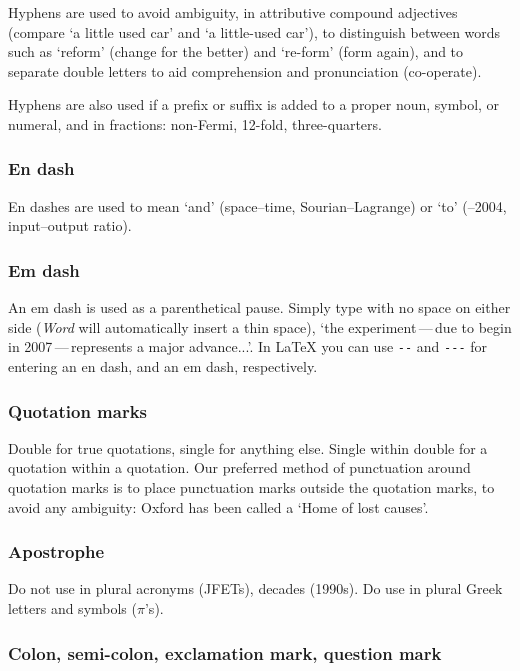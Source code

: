 \documentclass{cernyrep}
\begin{document}
Hyphens are used to avoid ambiguity, \ie in attributive compound
adjectives (compare `a little used car' and `a little-used car'), to
distinguish between words such as `reform' (change for the better) and
`re-form' (form again), and to separate double letters to aid
comprehension and pronunciation (\eg co-operate).

Hyphens are also used if a prefix or suffix is added to a proper noun,
symbol, or numeral, and in fractions: \eg non-Fermi, 12-fold,
three-quarters.

\subsubsection{En dash}

En dashes are used to mean `and' (\eg space--time, Sourian--Lagrange)
or `to' (--2004, input--output ratio).

\subsubsection{Em dash}

An em dash is used as a parenthetical pause. Simply type with no space
on either side (\emph{Word} will automatically insert a thin space),
\eg `the experiment\,---\,due to begin in 2007\,---\,represents a
major advance...'. In \LaTeX{} you can use \texttt{{-}{-}} and
\texttt{{-}{-}{-}} for entering an en dash, and an em dash,
respectively.

\subsubsection{Quotation marks}

Double for true quotations, single for anything else. Single within
double for a quotation within a quotation. Our preferred method of
punctuation around quotation marks is to place punctuation marks
outside the quotation marks, to avoid any ambiguity: Oxford has been
called a `Home of lost causes'.


\subsubsection{Apostrophe}

Do not use in plural acronyms (\eg JFETs), decades (1990s).  Do use
in plural Greek letters and symbols (\eg $\pi$'s).

\subsubsection{Colon, semi-colon, exclamation mark, question mark}
\end{document}
